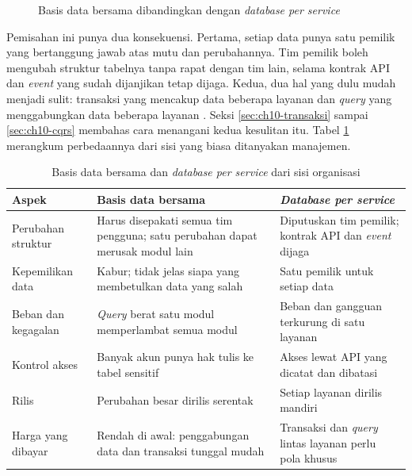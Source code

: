 \begin{figure}[!htb]
  \centering
  
  \caption{Basis data bersama dibandingkan dengan \textit{database per service}}
  \label{fig:ch10-basis-data}
\end{figure}

Pemisahan ini punya dua konsekuensi. Pertama, setiap data punya satu pemilik yang bertanggung jawab
atas mutu dan perubahannya. Tim pemilik boleh mengubah struktur tabelnya tanpa rapat dengan tim
lain, selama kontrak API dan \textit{event} yang sudah dijanjikan tetap dijaga. Kedua, dua hal yang
dulu mudah menjadi sulit: transaksi yang mencakup data beberapa layanan dan \textit{query} yang
menggabungkan data beberapa layanan \cite{c10-richardson-dbps}. Seksi
\ref{sec:ch10-transaksi} sampai \ref{sec:ch10-cqrs} membahas cara menangani kedua kesulitan itu.
Tabel \ref{tab:ch10-dampak-bersama} merangkum perbedaannya dari sisi yang biasa ditanyakan manajemen.

\begin{table}[!htb]
  \centering
  \caption{Basis data bersama dan \textit{database per service} dari sisi organisasi}
  \label{tab:ch10-dampak-bersama}
  \footnotesize
  \begin{tabularx}{\textwidth}{>{\raggedright\arraybackslash}p{2.3cm} >{\raggedright\arraybackslash}X >{\raggedright\arraybackslash}X}
    \hline
    \textbf{Aspek} & \textbf{Basis data bersama} & \textbf{\textit{Database per service}} \\ \hline
    Perubahan struktur & Harus disepakati semua tim pengguna; satu perubahan dapat merusak modul
      lain & Diputuskan tim pemilik; kontrak API dan \textit{event} dijaga \\ \hline
    Kepemilikan data & Kabur; tidak jelas siapa yang membetulkan data yang salah & Satu pemilik
      untuk setiap data \\ \hline
    Beban dan kegagalan & \textit{Query} berat satu modul memperlambat semua modul & Beban dan
      gangguan terkurung di satu layanan \\ \hline
    Kontrol akses & Banyak akun punya hak tulis ke tabel sensitif & Akses lewat API yang dicatat
      dan dibatasi \\ \hline
    Rilis & Perubahan besar dirilis serentak & Setiap layanan dirilis mandiri \\ \hline
    Harga yang dibayar & Rendah di awal: penggabungan data dan transaksi tunggal mudah &
      Transaksi dan \textit{query} lintas layanan perlu pola khusus \\ \hline
  \end{tabularx}
\end{table}

